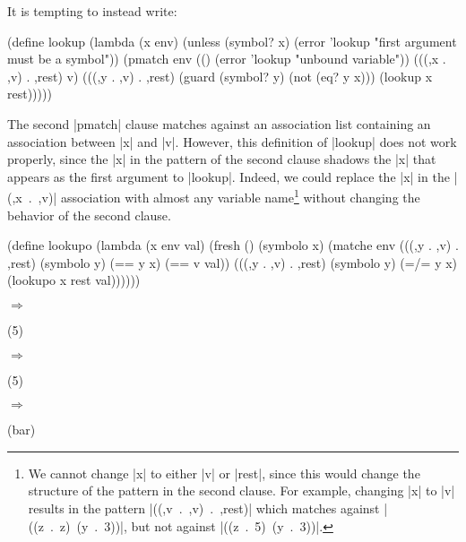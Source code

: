 It is tempting to instead write:

\begin{schemedisplay}
(define lookup
  (lambda (x env)
    (unless (symbol? x)
      (error 'lookup "first argument must be a symbol"))
    (pmatch env
      (() (error 'lookup "unbound variable"))
      (((,x . ,v) . ,rest)
       v)
      (((,y . ,v) . ,rest) (guard (symbol? y) (not (eq? y x)))
       (lookup x rest)))))
\end{schemedisplay}

The second \scheme|pmatch| clause matches against an association list
containing an association between \scheme|x| and \scheme|v|.  However,
this definition of \scheme|lookup| does not work properly, since the
\scheme|x| in the pattern of the second clause shadows the \scheme|x|
that appears as the first argument to \scheme|lookup|.  Indeed, we
could replace the \scheme|x| in the \mbox{\scheme|(,x . ,v)|}
association with almost any variable name\footnote{We cannot change
  \scheme|x| to either \scheme|v| or \scheme|rest|, since this would
  change the structure of the pattern in the second clause.  For
  example, changing \scheme|x| to \scheme|v| results in the pattern
  \mbox{\scheme|((,v . ,v) . ,rest)|} which matches against
  \mbox{\scheme|((z . z) (y . 3))|}, but not against \mbox{\scheme|((z
    . 5) (y . 3))|}.} without changing the behavior of the second
clause.


\begin{schemedisplay}
(define lookupo
  (lambda (x env val)
    (fresh ()
      (symbolo x)
      (matche env
        (((,y . ,v) . ,rest) (symbolo y)
         (== y x) (== v val))
        (((,y . ,v) . ,rest) (symbolo y)
         (=/= y x) (lookupo x rest val))))))
\end{schemedisplay}

\noindent{} $\Rightarrow$
\begin{schemeresponsebox}(5)\end{schemeresponsebox}

\noindent{} $\Rightarrow$
\begin{schemeresponsebox}(5)\end{schemeresponsebox}

\noindent{} $\Rightarrow$
\begin{schemeresponsebox}(bar)\end{schemeresponsebox}


